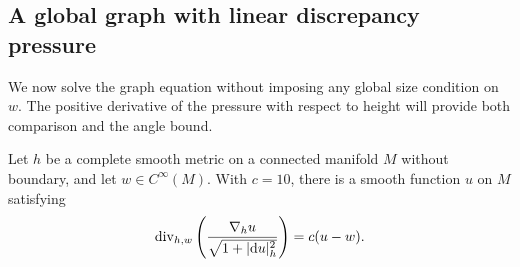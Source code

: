 \subsection{A global graph with linear discrepancy pressure}

We now solve the graph equation without imposing any global size
condition on $w$. The positive derivative of the pressure with respect to height
will provide both comparison and the angle bound.

\begin{lemma}\label{pre:global-graph}
Let $h$ be a complete smooth metric on a connected manifold $M$ without
boundary, and let $w\in C^\infty(M)$. With $c=10$, there is a smooth
function $u$ on $M$ satisfying
\begin{equation}\label{pre:global-equation}
 \operatorname{div}_{h,w}\left(\frac{\nabla_hu}{\sqrt{1+|\mathrm d u|_h^2}}\right)
       =c(u-w).
\end{equation}
\end{lemma}

